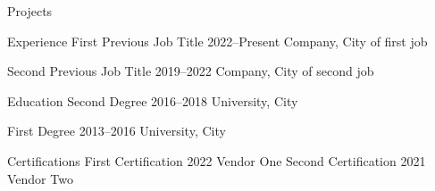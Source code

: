 \documentclass{src/cv}
\begin{document}
\begin{career}
{\begin{careersection}{Projects}
{\begin{careeritemdetails}
	\item \lipsum[8][1-2] 
	\item \lipsum[8][3-4]
	\item \lipsum[8][5-6]
        \end{careeritemdetails}
        }
    \end{careersection}
    }
    \columnbreak
    \begin{careersection}{Experience}
        \careeritem
        {First Previous Job Title}
        {2022--Present}
        {Company, City of first job}
        {
        \begin{careeritemdetails}	
	    \item \lipsum[9][1-2] 
	    \item \lipsum[9][3-4]
        \end{careeritemdetails}
        }
        \careeritem
        {Second Previous Job Title}
        {2019--2022}
        {Company, City of second job}
        {
        \begin{careeritemdetails}	
	    \item \lipsum[10][1-2] 
	    \item \lipsum[10][3-4]
        \end{careeritemdetails}
        }
    \end{careersection}
    \vfill
    \begin{careersection}{Education}
        \careeritem
        {Second Degree}
        {2016--2018}
        {University, City}
        {
        \begin{careeritemdetails}	
	    \item \lipsum[11][1-2]
        \end{careeritemdetails}
        }
        \careeritem
        {First Degree}
        {2013--2016}
        {University, City}
        {
        \begin{careeritemdetails}	
	    \item \lipsum[12][1-2]
        \end{careeritemdetails}
        }
    \end{careersection}
    \vfill
    \begin{careersection}{Certifications}
        \careeritem
	{First Certification}
        {2022}
        {Vendor One}
        {}
        \careeritem
	{Second Certification}
        {2021}
        {Vendor Two}
        {}
    \end{careersection}

\end{career}
\end{document}
